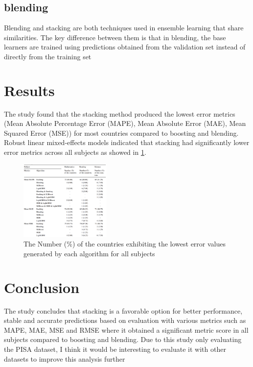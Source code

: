 \documentclass[final,5p,times,twocolumn,authoryear]{elsarticle}
\begin{document}
\subsection{blending}
Blending and stacking are both techniques used in ensemble learning that share similarities. The key difference between them is that in blending, the base learners are trained using predictions obtained from the validation set instead of directly from the training set\cite{Stacking}
\section{Results}
The study found that the stacking method produced the lowest error metrics (Mean Absolute Percentage Error (MAPE), Mean Absolute Error (MAE), Mean Squared Error (MSE)) for most countries compared to boosting and blending. Robust linear mixed-effects models indicated that stacking had significantly lower error metrics across all subjects as showed in \ref{fig:results}.

\begin{figure}
  \centering
  \includegraphics[width=0.4\textwidth]{figures/figure1}
  \caption{The Number (\%) of the countries exhibiting the lowest error values generated by each algorithm for all subjects \cite{Stacking}}
  \label{fig:results}
\end{figure}

\section{Conclusion}
The study \cite{Stacking} concludes that stacking is a favorable option for better performance, stable and accurate predictions based on evaluation with various metrics such as MAPE, MAE, MSE and RMSE where it obtained a significant metric score in all subjects compared to boosting and blending.
Due to this study only evaluating the PISA dataset, I think it would be interesting to evaluate it with other datasets to improve this analysis further










\end{document}
